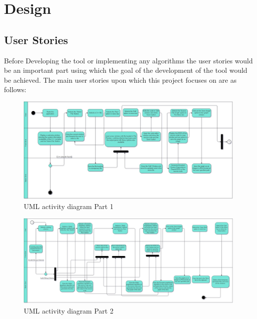\documentclass[conference]{IEEEtran}
\begin{document}
\section{Design}
\subsection{User Stories}
Before Developing the tool or implementing any algorithms the user stories would be an important part using which the goal of the development of the tool would be achieved. The main user stories upon which this project focuses on are as follows:
\begin{figure}[t]
    \centering
    \includegraphics[scale=0.3]{UML_Activity_Left.jpg}
    \caption{UML activity diagram Part 1}
    \label{fig:my_label}
\end{figure}
\begin{figure}[t]
    \centering
    \includegraphics[scale=0.27]{UML_Activity_Right.jpg}
    \caption{UML activity diagram Part 2}
    \label{fig:my_label}
\end{figure}
\end{document}
